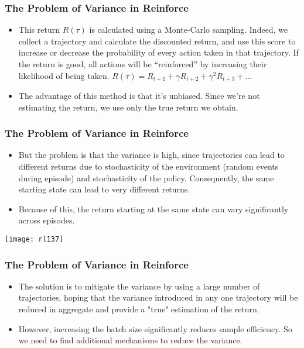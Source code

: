 \begin{frame}[fragile]\frametitle{The Problem of Variance in Reinforce}


\begin{itemize}
\item This return $R(\tau)$ is calculated using a Monte-Carlo sampling. Indeed, we collect a trajectory and calculate the discounted return, and use this score to increase or decrease the probability of every action taken in that trajectory. If the return is good, all actions will be ``reinforced'' by increasing their likelihood of being taken. $R(\tau) = R_{t+1} + \gamma R_{t+2} + \gamma^2 R_{t+3} + \ldots$
\item The advantage of this method is that it's unbiased. Since we're not estimating the return, we use only the true return we obtain.

\end{itemize}



\end{frame}

\begin{frame}[fragile]\frametitle{The Problem of Variance in Reinforce}


\begin{itemize}
\item But the problem is that the variance is high, since trajectories can lead to different returns due to stochasticity of the environment (random events during episode) and stochasticity of the policy. Consequently, the same starting state can lead to very different returns. 
\item Because of this, the return starting at the same state can vary significantly across episodes.
\end{itemize}

\begin{center}
\texttt{[image: rl137]}
\end{center}


\end{frame}



\begin{frame}[fragile]\frametitle{The Problem of Variance in Reinforce}


\begin{itemize}
\item The solution is to mitigate the variance by using a large number of trajectories, hoping that the variance introduced in any one trajectory will be reduced in aggregate and provide a "true" estimation of the return.
\item 
However, increasing the batch size significantly reduces sample efficiency. So we need to find additional mechanisms to reduce the variance.
\end{itemize}


\end{frame}


